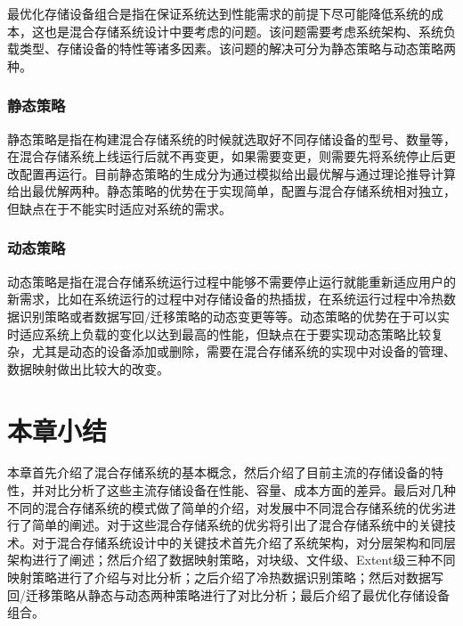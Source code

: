 最优化存储设备组合是指在保证系统达到性能需求的前提下尽可能降低系统的成本，这也是混合存储系统设计中要考虑的问题。该问题需要考虑系统架构、系统负载类型、存储设备的特性等诸多因素。该问题的解决可分为静态策略与动态策略两种。

\subsubsection{静态策略}

静态策略是指在构建混合存储系统的时候就选取好不同存储设备的型号、数量等，在混合存储系统上线运行后就不再变更，如果需要变更，则需要先将系统停止后更改配置再运行。目前静态策略的生成分为通过模拟\cite{guerra2011cost}给出最优解与通过理论推导计算\cite{kim2011hybridstore}给出最优解两种。静态策略的优势在于实现简单，配置与混合存储系统相对独立，但缺点在于不能实时适应对系统的需求。

\subsubsection{动态策略}

动态策略是指在混合存储系统运行过程中能够不需要停止运行就能重新适应用户的新需求，比如在系统运行的过程中对存储设备的热插拔，在系统运行过程中冷热数据识别策略或者数据写回/迁移策略的动态变更等等。动态策略的优势在于可以实时适应系统上负载的变化以达到最高的性能，但缺点在于要实现动态策略比较复杂，尤其是动态的设备添加或删除，需要在混合存储系统的实现中对设备的管理、数据映射做出比较大的改变。

\section{本章小结}

本章首先介绍了混合存储系统的基本概念，然后介绍了目前主流的存储设备的特性，并对比分析了这些主流存储设备在性能、容量、成本方面的差异。最后对几种不同的混合存储系统的模式做了简单的介绍，对发展中不同混合存储系统的优劣进行了简单的阐述。对于这些混合存储系统的优劣将引出了混合存储系统中的关键技术。对于混合存储系统设计中的关键技术首先介绍了系统架构，对分层架构和同层架构进行了阐述；然后介绍了数据映射策略，对块级、文件级、Extent级三种不同映射策略进行了介绍与对比分析；之后介绍了冷热数据识别策略；然后对数据写回/迁移策略从静态与动态两种策略进行了对比分析；最后介绍了最优化存储设备组合。